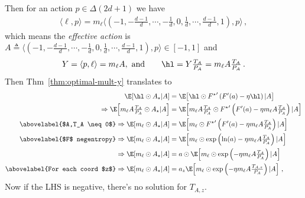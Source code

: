 Then for an action $p \in \Delta(2d + 1)$ we have
\begin{align*}
    \langle \ell, p\rangle = m_\ell
    \langle
    (-1, -\tfrac{d-1}{d}, \cdots, -\tfrac{1}{d},
    0, \tfrac{1}{d}, \cdots, \tfrac{d-1}{d}, 1)
    , p
    \rangle\,,
\end{align*}
which means the \textit{effective action} is
$
    A \triangleq
    \langle
    (-1, -\tfrac{d-1}{d}, \cdots, -\tfrac{1}{d},
    0, \tfrac{1}{d}, \cdots, \tfrac{d-1}{d}, 1)
    , p
    \rangle
    \in [-1, 1]
$ and
\begin{align*}
    Y = \langle p, \ell \rangle = m_\ell A,\,\,
    \text{and}
    \qquad
    \hl = Y \tfrac{T_A}{P_A} = m_\ell A \tfrac{T_A}{P_A}\,.
\end{align*}
Then Thm~\ref{thm:optimal-mult-y} translates to
\begin{align*}
    \E\!\left[
        \hl \odot A_\star
        | A
        \right]
     & =
    \E\!\left[
        \hl \odot {F^\star}'\left(F'(a) - \eta \hl\right)
        | A
        \right]
    \\
    \Rightarrow
    \E\!\left[
        m_\ell A \tfrac{T_A}{P_A} \odot A_\star
        | A
        \right]
     & =
    \E\!\left[
        m_\ell A \tfrac{T_A}{P_A} \odot {F^\star}'\left(F'(a) - \eta m_\ell A \tfrac{T_A}{P_A}\right)
        | A
        \right]
    \\
    \abovelabel{$A,T_A \neq 0$}
    \Rightarrow
    \E\!\left[
        m_\ell \odot A_\star
        | A
        \right]
     & =
    \E\!\left[
        m_\ell \odot {F^\star}'\left(F'(a) - \eta m_\ell A \tfrac{T_A}{P_A}\right)
        | A
        \right]
    \\
    \abovelabel{$F$ negentropy}
    \Rightarrow
    \E\!\left[
        m_\ell \odot A_\star
        | A
        \right]
     & =
    \E\!\left[
        m_\ell \odot \exp\left(\ln(a) - \eta m_\ell A \tfrac{T_A}{P_A}\right)
        | A
        \right]
    \\
    \Rightarrow
    \E\!\left[
        m_\ell \odot A_\star
        | A
        \right]
     & =
    a \odot
    \E\!\left[
        m_\ell \odot \exp\left(- \eta m_\ell A \tfrac{T_A}{P_A}\right)
        | A
        \right]
    \\
    \abovelabel{For each coord $z$}
    \Rightarrow
    \E\!\left[
        m_\ell \odot A_\star
        | A
        \right]
     & =
    a_z
    \E\!\left[
        m_\ell \odot \exp\left(- \eta m_\ell A \tfrac{T_{A,z}}{P_A}\right)
        | A
        \right]\,,
\end{align*}
Now if the LHS is negative, there's no solution for $T_{A,z}$.

